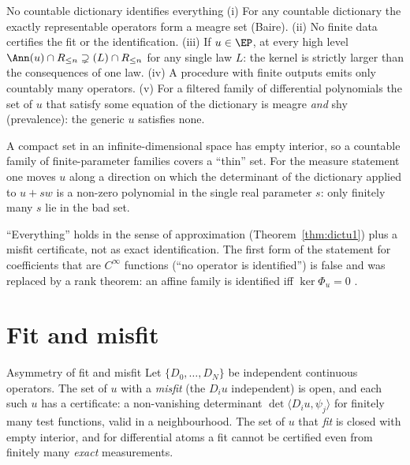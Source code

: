 \begin{theorem}{No countable dictionary identifies everything  \proved}\label{thm:dictn1}
(i) For any countable dictionary the exactly representable operators form a meagre set (Baire). (ii) No finite data certifies the fit or the identification. (iii) If $u\in\EP$, at every high level $\Ann(u)\cap R_{\le n}\supsetneq(L)\cap R_{\le n}$ for any single law $L$: the kernel is strictly larger than the consequences of one law. (iv) A procedure with finite outputs emits only countably many operators. (v) For a filtered family of differential polynomials the set of $u$ that satisfy some equation of the dictionary is meagre \emph{and} shy (prevalence): the generic $u$ satisfies none.
\end{theorem}

\begin{intuition}
A compact set in an infinite-dimensional space has empty interior, so a countable family of finite-parameter families covers a ``thin'' set. For the measure statement one moves $u$ along a direction on which the determinant of the dictionary applied to $u+sw$ is a non-zero polynomial in the single real parameter $s$: only finitely many $s$ lie in the bad set.
\end{intuition}

\begin{caution}[title=What this theorem does not say]
``Everything'' holds in the sense of approximation (Theorem~\ref{thm:dictu1}) plus a misfit certificate, not as exact identification. The first form of the statement for coefficients that are $C^\infty$ functions (``no operator is identified'') is false and was replaced by a rank theorem: an affine family is identified iff $\ker\Phi_u=0$ .
\end{caution}

\section{Fit and misfit}

\begin{theorem}{Asymmetry of fit and misfit  \proved}\label{thm:dicta}
Let $\{D_0,\dots,D_N\}$ be independent continuous operators. The set of $u$ with a \emph{misfit} (the $D_iu$ independent) is open, and each such $u$ has a certificate: a non-vanishing determinant $\det\langle D_iu,\psi_j\rangle$ for finitely many test functions, valid in a neighbourhood. The set of $u$ that \emph{fit} is closed with empty interior, and for differential atoms a fit cannot be certified even from finitely many \emph{exact} measurements.
\end{theorem}

